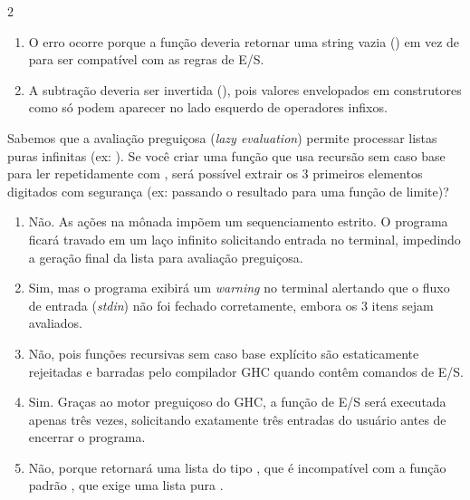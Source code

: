 \documentclass[a4paper,10pt,brazil]{article}
\begin{document}
\begin{multicols}{2}
\begin{enumerate}
  \item O erro ocorre porque a função  deveria retornar uma string vazia () em vez de  para ser compatível com as regras de E/S.

  \item A subtração deveria ser invertida (), pois valores envelopados em construtores como  só podem aparecer no lado esquerdo de operadores infixos.


\end{enumerate}

Sabemos que a avaliação preguiçosa (\emph{lazy evaluation}) permite processar listas puras infinitas (ex: ). 
Se você criar uma função  que usa recursão sem caso base para ler repetidamente com , será possível extrair os 3 primeiros elementos digitados com segurança (ex: passando o resultado para uma função de limite)?

\begin{enumerate}
  \item Não. As ações na mônada  impõem um sequenciamento estrito. O programa ficará travado em um laço infinito solicitando entrada no terminal, impedindo a geração final da lista para avaliação preguiçosa.

  \item Sim, mas o programa exibirá um \emph{warning} no terminal alertando que o fluxo de entrada (\emph{stdin}) não foi fechado corretamente, embora os 3 itens sejam avaliados.

  \item Não, pois funções recursivas sem caso base explícito são estaticamente rejeitadas e barradas pelo compilador GHC quando contêm comandos de E/S.

  \item Sim. Graças ao motor preguiçoso do GHC, a função de E/S será executada apenas três vezes, solicitando exatamente três entradas do usuário antes de encerrar o programa.

  \item Não, porque  retornará uma lista do tipo \haskellinline{[IO String]}, que é incompatível com a função padrão , que exige uma lista pura \haskellinline{[a]}.


\end{enumerate}


\end{multicols}
\end{document}
